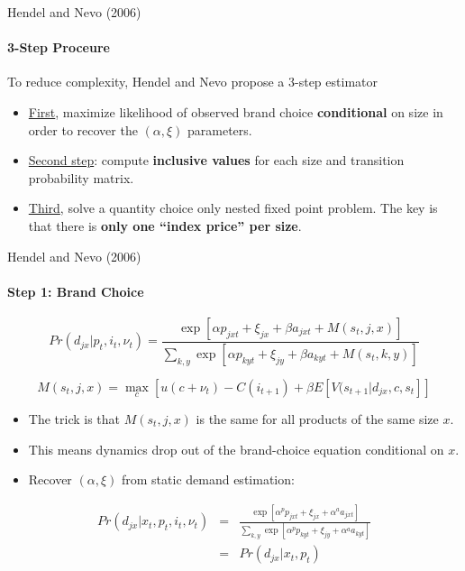 \documentclass[11pt,aspectratio=169]{beamer}
\begin{document}
\begin{frame}{Hendel and Nevo (2006)}
\framesubtitle{3-Step Proceure}
To reduce complexity, Hendel and Nevo propose a 3-step estimator
\begin{itemize}
\item[$-$] \underline{First}, maximize likelihood of observed brand choice \textbf{conditional} on size in order to recover the $(\alpha,\xi)$ parameters.
\item[$-$] \underline{Second step}: compute \textbf{inclusive values} for each size and transition probability matrix.
\item[$-$] \underline{Third}, solve a quantity choice only nested fixed point problem. The key is that there is \textbf{only one ``index price'' per size}.
\end{itemize}
\end{frame}

\begin{frame}{Hendel and Nevo (2006)}
\framesubtitle{Step 1: Brand Choice}
\small
\begin{equation*}
Pr(d_{jx} | p_t,i_t,\nu_t) = \frac{\exp[\alpha p_{jxt} + \xi_{jx} + \beta a_{jxt} + M(s_t,j,x)]}{\sum_{k,y} \exp[\alpha p_{kyt} + \xi_{jy} + \beta a_{kyt} + M(s_t,k,y)]}
\end{equation*}

\vspace{0.2cm}

\begin{equation*}
M (s_t,j,x) = \max_c [ u(c+\nu_t) - C(i_{t+1}) + \beta E[V(s_{t+1}|d_{jx},c,s_t]]
\end{equation*}


\begin{itemize}
\small
\item[$-$] The trick is that $M(s_t,j,x)$ is the same for all products of the same size $x$.
\item[$-$] This means dynamics drop out of the brand-choice equation conditional on $x$.
\item[$-$] Recover $(\alpha, \xi)$ from static demand estimation:
\end{itemize}
\begin{eqnarray*}
Pr(d_{jx} | x_t, p_t,i_t,\nu_t) &=& \frac{\exp[\alpha^p p_{jxt} + \xi_{jx} + \alpha^a a_{jxt}]}{\sum_{k,y} \exp[\alpha^p p_{kyt} + \xi_{jy} + \alpha^a a_{kyt}  ] }\\
&=&Pr(d_{jx} | x_t, p_t)
\end{eqnarray*}

\end{frame}
\end{document}
